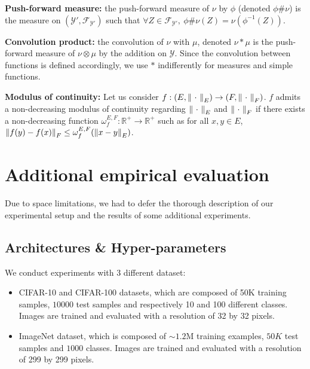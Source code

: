 \textbf{Push-forward measure:} the push-forward measure of $\nu$ by $\phi$ (denoted $\phi \# \nu$) is the measure on $(\mathcal{Y'},\mathcal{F}_{\mathcal{Y'}})$ such that $\forall Z \in \mathcal{F}_{\mathcal{Y'}}, \ \phi \# \nu(Z) = \nu(\phi^{-1}(Z)) $.

\textbf{Convolution product:} the convolution of $\nu$ with $\mu$, denoted $\nu * \mu$ is the push-forward measure of $\nu \otimes \mu$ by the addition on $\mathcal{Y}$. Since the convolution between functions is defined accordingly, we use $*$ indifferently for measures and simple functions. 

\textbf{Modulus of continuity:} Let us consider $f:(E,\norm{\ \cdot\ }_E)\rightarrow(F,\norm{\ \cdot\ }_F)$. $f$ admits a non-decreasing modulus of continuity regarding $\norm{\ \cdot\ }_E$ and $\norm{\ \cdot\ }_F$ if there exists a non-decreasing function $\omega^{E,F}_f:\mathbb{R^+}\rightarrow\mathbb{R^+}$ such as for all $x,y\in E$, $\norm{f(y) - f(x)}_F \leq \omega^{E,F}_f(\norm{x - y}_E)$.


\section{Additional empirical evaluation}

Due to space limitations, we had to defer the thorough description of our experimental setup and the results of some additional experiments.

\subsection{Architectures \& Hyper-parameters}

We conduct experiments with 3 different dataset:
\begin{itemize}
    \item CIFAR-10 and CIFAR-100 datasets, which are composed of 50K training samples, $10000$ test samples and respectively 10 and 100 different classes. Images are trained and evaluated with a resolution of 32 by 32 pixels. 
    \item ImageNet dataset, which is composed of $\sim1.2$M training examples, $50K$ test samples and $1000$ classes. Images are trained and evaluated with a resolution of 299 by 299 pixels. 
\end{itemize}

